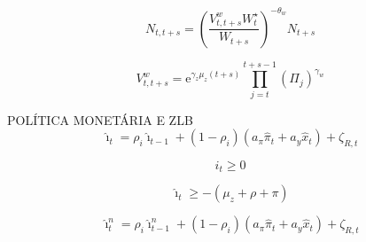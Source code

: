 \[
N_{t, t+s}=\left(\frac{V_{t, t+s}^{w} W_{t}^{\star}}{W_{t+s}}\right)^{-\theta_{w}} N_{t+s}
\]

\[
V_{t, t+s}^{w}=\mathrm{e}^{\gamma_{z} \mu_{z}(t+s)} \prod_{j=t}^{t+s-1}\left(\Pi_{j}\right)^{\gamma_{w}}
\]

POLÍTICA MONETÁRIA E ZLB
\[
\hat{\imath}_{t}=\rho_{i} \hat{\imath}_{t-1}+\left(1-\rho_{i}\right)\left(a_{\pi} \hat{\pi}_{t}+a_{y} \hat{x}_{t}\right)+\zeta_{R, t}
\]

\[
i_{t} \geq 0
\]

\[
\hat{\imath}_{t} \geq-\left(\mu_{z}+\rho+\pi\right)
\]

\[
\hat{\imath}_{t}^{n}=\rho_{i} \hat{\imath}_{t-1}^{n}+\left(1-\rho_{i}\right)\left(a_{\pi} \hat{\pi}_{t}+a_{y} \hat{x}_{t}\right)+\zeta_{R, t}
\]





%
%
%
%
%




